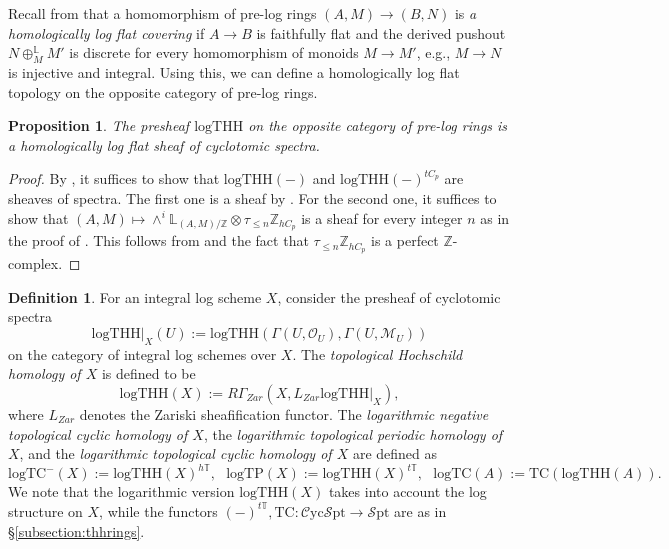 \documentclass[11pt, a4paper]{amsart}
\newtheorem{prop}[thm]{Proposition}
\theoremstyle{definition}
\newtheorem{df}[thm]{Definition}
\numberwithin{equation}{subsection}
\newcommand{\Z}{\mathbb{Z}}
\newcommand{\bbL}{\mathbb{L}}
\newcommand{\TC}{\mathrm{TC}}
\newcommand{\logTHH}{\mathrm{logTHH}}
\newcommand{\logTC}{\mathrm{logTC}}
\newcommand{\logTP}{\mathrm{logTP}}
\newcommand{\cM}{\mathcal{M}}
\newcommand{\cO}{\mathcal{O}}
\newcommand{\infSpt}{\mathcal{S}\mathrm{pt}}
\newcommand{\infCycSpt}{\mathcal{C}\mathrm{yc}\mathcal{S}\mathrm{pt}}
\begin{document}
Recall from \cite[Definition 2.44]{Koshikawa-Yao} that a homomorphism of pre-log rings $(A,M)\to (B,N)$ is \emph{a homologically log flat covering} if $A\to B$ is faithfully flat and
the derived pushout $N\oplus_M^\bbL M'$ is discrete for every homomorphism of monoids $M\to M'$,
e.g., $M\to N$ is injective and integral.
Using this,
we can define a homologically log flat topology on the opposite category of pre-log rings.

\begin{prop}
\label{THHsheaf.1}
The presheaf $\logTHH$ on the opposite category of pre-log rings is a homologically log flat sheaf of cyclotomic spectra.
\end{prop}
\begin{proof}
By \cite[Proposition II.1.5(v)]{NikolausScholze},
it suffices to show that $\logTHH(-)$ and $\logTHH(-)^{tC_p}$ are sheaves of spectra.
The first one is a sheaf by \cite[Proposition 3.10]{BLPO2}.
For the second one,
it suffices to show that $(A,M)\mapsto \wedge^i \bbL_{(A,M)/\Z} \otimes \tau_{\leq n}\Z_{hC_p}$ is a sheaf for every integer $n$ as in the proof of \cite[Corollary 3.4]{BMS19}.
This follows from \cite[Theorem 2.3]{BLPO2} and the fact that $\tau_{\leq n} \Z_{hC_p}$ is a perfect $\Z$-complex.
\end{proof}

\begin{df}
\label{THHsheaf.2}
For an integral log scheme $X$,
consider the presheaf of cyclotomic spectra
\[
\logTHH|_X(U)
:=
\logTHH(\Gamma(U,\cO_U),\Gamma(U,\cM_U))
\]
on the category of integral log schemes over $X$.
The \emph{topological Hochschild homology of $X$} is defined to be
\[
\logTHH(X)
:=
R\Gamma_{Zar}(X,L_{Zar}\logTHH|_X),
\]
where $L_{Zar}$ denotes the Zariski sheafification functor.
The \emph{logarithmic negative topological cyclic homology of $X$}\index[notation]{logTC- @ $\logTC^{-}$},
the \emph{logarithmic topological periodic homology of $X$}\index[notation]{logTP @ $\logTP$},
and the \emph{logarithmic topological cyclic homology of $X$}\index[notation]{logTC @ $\logTC$}
are defined as 
\begin{equation}
\logTC^{-}(X)
:=
\logTHH(X)^{h\mathbb{T}},
\text{ }
\logTP(X)
:=
\logTHH(X)^{t\mathbb{T}},
\text{ }
\logTC(A)
:=
\TC(\logTHH(A)).
\end{equation}
We note that the logarithmic version $\logTHH(X)$ takes into account the log structure on $X$, 
while the functors $(-)^{t\mathbb{T}},\TC\colon \infCycSpt\to \infSpt$ are as in \S\ref{subsection:thhrings}.
\end{df}
\end{document}
